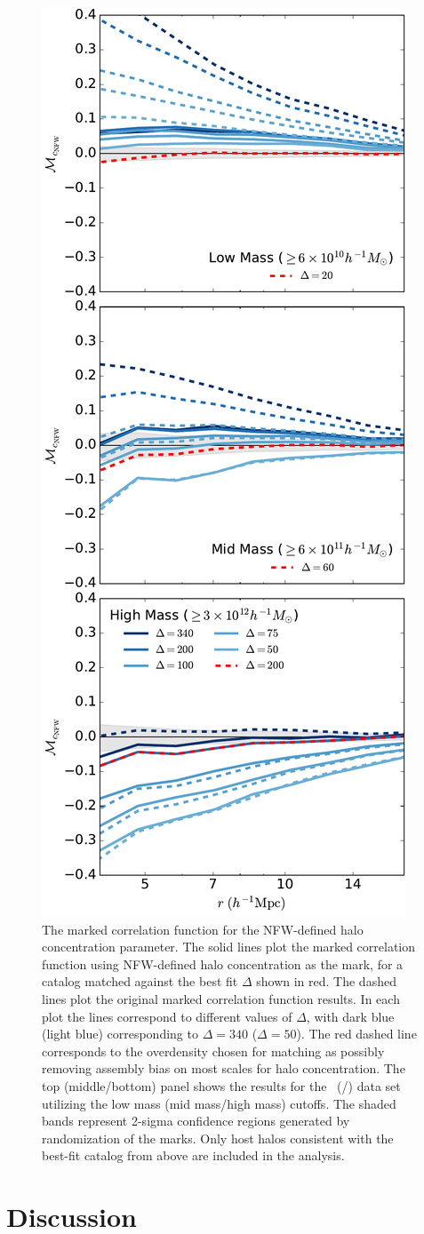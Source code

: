 \documentclass[usenatbib,fleqn]{mnras}
\begin{document}
\begin{figure}
	\centering
	\includegraphics[width=.4\textwidth]{match_mcf_cNFW.pdf}
	\caption{The marked correlation function for the NFW-defined halo concentration parameter. The solid lines plot the marked correlation function using NFW-defined halo concentration as the mark, for a catalog matched against the best fit $\Delta$ shown in red. The dashed lines plot the original marked correlation function results. In each plot the lines correspond to different values of $\Delta$, with dark blue (light blue) corresponding to $\Delta = 340$ ($\Delta = 50$). The red dashed line corresponds to the overdensity chosen for matching as possibly removing assembly bias on most scales for halo concentration. The top (middle/bottom) panel shows the results for the
\simA \ (\simB /\simC) data set utilizing the low mass (mid mass/high mass) cutoffs. The shaded bands represent 2-sigma confidence regions generated by randomization of the marks. Only host halos consistent with the best-fit catalog from above are included in the analysis.}
	\label{fig:hvm_mcf_cnfw}
\end{figure}



\section{Discussion}
\label{section:discussion}
\end{document}
